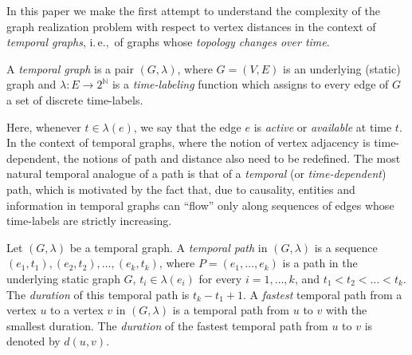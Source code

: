 \documentclass[a4paper,UKenglish,cleveref, autoref, thm-restate, anonymous]{lipics-v2021}
\newcommand{\ie}{i.\,e.,\ }
\begin{document}
In this paper we make the first attempt to understand the complexity of the graph realization problem with respect to vertex distances in the context of \emph{temporal graphs}, \ie of graphs whose \emph{topology changes over time}. 

\begin{definition}
\label{temp-graph-def} A \emph{temporal graph} is a pair $(G,\lambda)$,
where $G=(V,E)$ is an underlying (static) graph and $\lambda :E\rightarrow 2^\mathbb{N}$ is a \emph{time-labeling} function which assigns to every edge of $G$ a set of discrete time-labels.
\end{definition}

Here, whenever $t \in \lambda(e)$, we say that the edge $e$ is \emph{active} or \emph{available} at time $t$. In the context of temporal graphs, where the notion of vertex adjacency is time-dependent, the notions of path and distance also need to be redefined. The most natural temporal analogue of a path is that of a \emph{temporal} (or \emph{time-dependent}) path, which is motivated by the fact that, due to
causality, entities and information in temporal graphs can ``flow'' only along sequences of
edges whose time-labels are strictly increasing.

\begin{definition} \label{def:temporalPath+Duration}
Let $(G,\lambda)$ be a temporal graph. A \emph{temporal path} 
in $(G,\lambda)$ is a sequence $(e_1,t_1),(e_2,t_2),\ldots,(e_k,t_k)$, 
where $P=(e_1,\ldots,e_k)$ is a path in the underlying static graph $G$, 
$t_i\in \lambda(e_i)$ for every $i=1,\ldots,k$, and $t_1<t_2<\ldots<t_k$. 
The \emph{duration} of this temporal path %
is $t_k - t_1 + 1$.
A \emph{fastest} temporal path from a vertex $u$ to a vertex $v$ in $(G,\lambda)$ is a temporal path from $u$ to $v$ with the smallest duration.
The \emph{duration} of the fastest temporal path from $u$ to $v$ is denoted by $d(u,v)$.
\end{definition}

\end{document}
